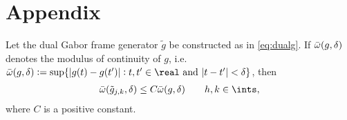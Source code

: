 \appendix
\section{Appendix}

\begin{lem} \label{lem:modtg}
  Let the dual Gabor frame generator $\tilde{g}$ be constructed as in \eqref{eq:dualg}. If ${\bar{\omega}}({g},\delta)$ denotes the modulus of continuity of $g$, i.e. $\modc{g}{\delta} := \sup \{|g(t) - g(t')| : t,t' \in \real \text{ and } |t -t'| < \delta\}$,  then   
  \begin{align}
    \modc{\tilde{g}_{j,k}}{\delta} \le C \modc{g}{\delta} \qquad  \hkints\notag,
    \label{}
  \end{align}
  where $C$ is a positive constant.
\end{lem}
